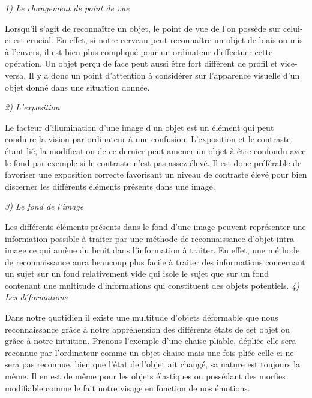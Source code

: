 \documentclass[a4paper,12pt]{article} %
\begin{document}
\textit{1)	Le changement de point de vue} \newline

Lorsqu’il s’agit de reconnaître un objet, le point de vue de l’on possède sur celui-ci est crucial. En effet, si notre cerveau peut reconnaître un objet de biais ou mis à l’envers, il est bien plus compliqué pour un ordinateur d’effectuer cette opération. Un objet perçu de face peut aussi être fort différent de profil et vice-versa. Il y a donc un point d’attention à considérer sur l’apparence visuelle d’un objet donné dans une situation donnée.\newline

\textit{2)	L’exposition}\newline

Le facteur d’illumination d’une image d’un objet est un élément qui peut conduire la vision par ordinateur à une confusion. L’exposition et le contraste étant lié, la modification de ce dernier peut amener un objet à être confondu avec le fond par exemple si le contraste n’est pas assez élevé. Il est donc préférable de favoriser une exposition correcte favorisant un niveau de contraste élevé pour bien discerner les différents éléments présents dans une image. \newline

\textit{3)	Le fond de l’image }\newline

Les différents éléments présents dans le fond d’une image peuvent représenter une information possible à traiter par une méthode de reconnaissance d’objet intra image ce qui amène du bruit dans l’information à traiter. En effet, une méthode de reconnaissance aura beaucoup plus facile à traiter des informations concernant un sujet sur un fond relativement vide qui isole le sujet que sur un fond contenant une multitude d’informations qui constituent des objets potentiels.\newline
\newpage
\textit{4)	Les déformations} \newline

Dans notre quotidien il existe une multitude d’objets déformable que nous reconnaissance grâce à notre appréhension des différents états de cet objet ou grâce à notre intuition. Prenons l’exemple d’une chaise pliable, dépliée elle sera reconnue par l’ordinateur comme un objet chaise mais une fois pliée celle-ci ne sera pas reconnue, bien que l’état de l’objet ait changé, sa nature est toujours la même. Il en est de même pour les objets élastiques ou possédant des morfies modifiable comme le fait notre visage en fonction de nos émotions.\newline
\end{document}
